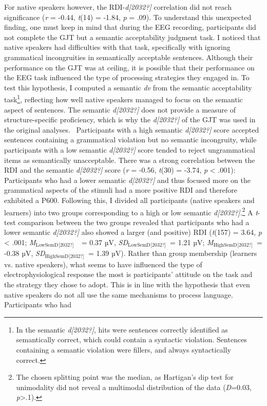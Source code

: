 \documentclass[11pt]{article}
\newcommand\textsubscript[1]{\ensuremath{{}_{\text{#1}}}}
\newenvironment{styleStandard}{\renewcommand\baselinestretch{1.0}\setlength\leftskip{0cm}\setlength\rightskip{0cm plus 1fil}\setlength\parindent{0cm}\setlength\parfillskip{0pt plus 1fil}\setlength\parskip{0in plus 1pt}\writerlistparindent\writerlistleftskip\leavevmode\normalfont\normalsize\writerlistlabel\ignorespaces}{\unskip\vspace{0.111in plus 0.0111in}\par}
\newcommand\writerlistleftskip{}
\newcommand\writerlistparindent{}
\newcommand\writerlistlabel{}
\begin{document}
\begin{styleStandard}
For native speakers however, the RDI-\textit{d[2032?]} correlation did not reach significance (\textit{r }= -0.44, \textit{t}(14) = -1.84, \textit{p }= .09). To understand this unexpected finding, one must keep in mind that during the EEG recording, participants did not complete the GJT but a semantic acceptability judgment task. I noticed that native speakers had difficulties with that task, specifically with ignoring grammatical incongruities in semantically acceptable sentences. Although their performance on the GJT was at ceiling, it is possible that their performance on the EEG task influenced the type of processing strategies they engaged in. To test this hypothesis, I computed a semantic \textit{dv} from the semantic acceptability task\footnote{\textrm{ In the semantic }\textrm{\textit{d[2032?]}}\textrm{, hits were sentences correctly identified as semantically correct, which could contain a syntactic violation. Sentences containing a semantic violation were fillers, and always syntactically correct.}}, reflecting how well native speakers managed to focus on the semantic aspect of sentences. The semantic \textit{d[2032?]} does not provide a measure of structure-specific proficiency, which is why the \textit{d[2032?]} of the GJT was used in the original analyses. \ Participants with a high semantic \textit{d[2032?] }score accepted sentences containing a grammatical violation but no semantic incongruity, while participants with a low semantic \textit{d[2032?]} score tended to reject ungrammatical items as semantically unacceptable. There was a strong correlation between the RDI and the semantic \textit{d[2032?]} score (\textit{r }= -0.56, \textit{t}(30) = -3.74, \textit{p }{\textless} .001): Participants who had a lower semantic \textit{d[2032?]} and thus focused more on the grammatical aspects of the stimuli had a more positive RDI and therefore exhibited a P600. Following this, I divided all participants (native speakers and learners) into two groups corresponding to a high or low semantic \textit{d[2032?]}.\footnote{ \textrm{The chosen splitting point was the median, as Hartigan’s dip test for unimodality did not reveal a multimodal distribution of the data (}\textrm{\textit{D}}\textrm{=0.03, }\textrm{\textit{p}}\textrm{{\textgreater}.1).}} A \textit{t}{}-test comparison between the two groups revealed that participants who had a lower semantic \textit{d[2032?]} also showed a larger (and positive) RDI (\textit{t}(157) = 3.64, \textit{p }{\textless} .001; \textit{M}\textsubscript{LowSemD}\textit{\textsubscript{[2032?]}}\textsubscript{ }\ = 0.37 µV, \textit{SD}\textsubscript{LowSemD}\textit{\textsubscript{[2032?]}}\textsubscript{ }= 1.21 µV;\textit{ M}\textsubscript{HighSemD}\textit{\textsubscript{[2032?]}}\textsubscript{ }= -0.38 µV, \textit{SD}\textsubscript{HighSemD}\textit{\textsubscript{[2032?]}}\textsubscript{ }= 1.39 µV). Rather than group membership (learners vs. native speakers), what seems to have influenced the type of electrophysiological response the most is participants’ attitude on the task and the strategy they chose to adopt. This is in line with the hypothesis that even native speakers do not all use the same mechanisms to process language. Participants who had 
\end{styleStandard}
\end{document}
